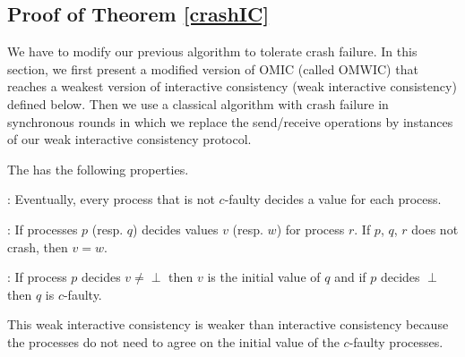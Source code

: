 \subsection{Proof of Theorem \ref{crashIC}}\label{app:thmCrash}


We have to modify our previous algorithm to tolerate crash failure.  
In this section, we first present a modified version of OMIC (called OMWIC)
that reaches a weakest version of interactive consistency (weak interactive consistency)  
defined below. Then we use a classical algorithm \cite{lamport1982crash,dolev1982polynomial,dwork1990knowledge} with crash failure in synchronous rounds in which we replace the send/receive operations by instances of our weak interactive consistency protocol.


The  {} has the
following properties.
\begin{itemizedot}
  \item {}: Eventually, every process  that is not $c$-faulty
decides a value for each process.
  
  \item {}: If  processes $p$ (resp. $q$) decides values $v$ (resp. $w$)
  for process $r$. If $p$, $q$, $r$ does not crash, then $v=w$.
  
  \item {}: If process $p$ decides $v\neq \perp$  then $v$ is the initial value of $q$ and if $p$ decides $\perp$ then $q$  is $c$-faulty.

\end{itemizedot}
This weak interactive consistency  is weaker than interactive consistency because  the  processes do not need to
agree on the initial value of the $c$-faulty processes.

